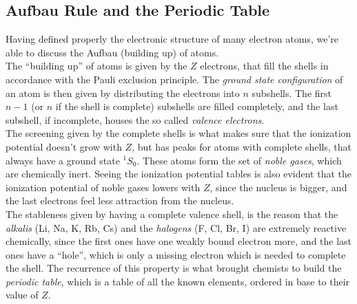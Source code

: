 \documentclass[../qm.tex]{subfiles}
\begin{document}
	\subsection{Aufbau Rule and the Periodic Table}
	Having defined properly the electronic structure of many electron atoms, we're able to discuss the Aufbau (building up) of atoms.\\
	The ``building up'' of atoms is given by the $Z$ electrons, that fill the shells in accordance with the Pauli exclusion principle. The \textit{ground state configuration} of an atom is then given by distributing the electrons into $n$ subshells. The first $n-1$ (or $n$ if the shell is complete) subshells are filled completely, and the last subshell, if incomplete, houses the so called \textit{valence electrons}.\\
	The screening given by the complete shells is what makes sure that the ionization potential doesn't grow with $Z$, but has peaks for atoms with complete shells, that always have a ground state $^1S_0$. These atoms form the set of \textit{noble gases}, which are chemically inert. Seeing the ionization potential tables is also evident that the ionization potential of noble gases lowers with $Z$, since the nucleus is bigger, and the last electrons feel less attraction from the nucleus.\\
	The stableness given by having a complete valence shell, is the reason that the \textit{alkalis} (Li, Na, K, Rb, Cs) and the \textit{halogens} (F, Cl, Br, I) are extremely reactive chemically, since the first ones have one weakly bound electron more, and the last ones have a ``hole'', which is only a missing electron which is needed to complete the shell. The recurrence of this property is what brought chemists to build the \textit{periodic table}, which is a table of all the known elements, ordered in base to their value of $Z$.
\end{document}

